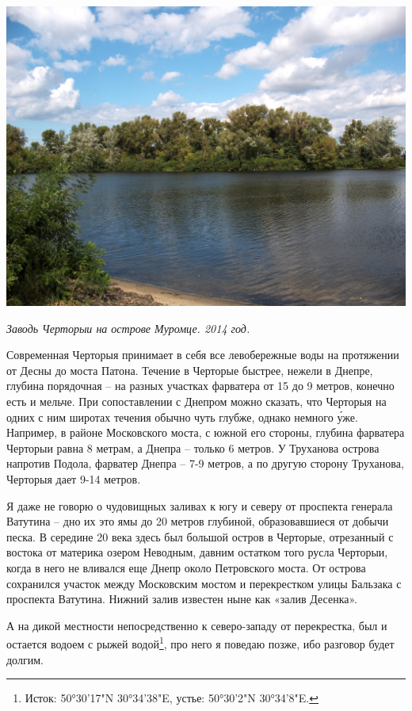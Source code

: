 \begin{center}
\includegraphics[width=\linewidth]{chast-gorodki/cherto/s_mur_CRW_3927.jpg}

\textit{Заводь Черторыи на острове Муромце. 2014 год.}
\end{center}
 
Современная Черторыя принимает в себя все левобережные воды на протяжении от Десны до моста Патона. Течение в Черторые быстрее, нежели в Днепре, глубина порядочная – на разных участках фарватера от 15 до 9 метров, конечно есть и мельче. При сопоставлении с Днепром можно сказать, что Черторыя на одних с ним широтах течения обычно чуть глубже, однако немного \'уже. Например, в районе Московского моста, с южной его стороны, глубина фарватера Черторыи равна 8 метрам, а Днепра – только 6 метров. У Труханова острова напротив Подола, фарватер Днепра – 7-9 метров, а по другую сторону Труханова, Черторыя дает 9-14 метров.

Я даже не говорю о чудовищных заливах к югу и северу от проспекта генерала Ватутина – дно их это ямы до 20 метров глубиной, образовавшиеся от добычи песка. В середине 20 века здесь был большой остров в Черторые, отрезанный с востока от материка озером Неводным, давним остатком того русла Черторыи, когда в него не вливался еще Днепр около Петровского моста. От острова сохранился участок между Московским мостом и перекрестком улицы Бальзака с проспекта Ватутина. Нижний залив известен ныне как «залив Десенка».

А на дикой местности непосредственно к северо-запа\-ду от перекрестка, был и остается водоем с рыжей водой\footnote{Исток: 50°30'17"N  30°34'38"E, устье: 50°30'2"N 30°34'8"E.}, про него я поведаю позже, ибо разговор будет долгим.

